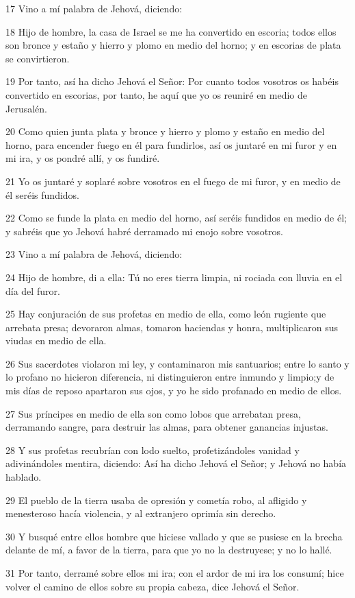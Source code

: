 \par 17 Vino a mí palabra de Jehová, diciendo:
\par 18 Hijo de hombre, la casa de Israel se me ha convertido en escoria; todos ellos son bronce y estaño y hierro y plomo en medio del horno; y en escorias de plata se convirtieron.
\par 19 Por tanto, así ha dicho Jehová el Señor: Por cuanto todos vosotros os habéis convertido en escorias, por tanto, he aquí que yo os reuniré en medio de Jerusalén.
\par 20 Como quien junta plata y bronce y hierro y plomo y estaño en medio del horno, para encender fuego en él para fundirlos, así os juntaré en mi furor y en mi ira, y os pondré allí, y os fundiré.
\par 21 Yo os juntaré y soplaré sobre vosotros en el fuego de mi furor, y en medio de él seréis fundidos.
\par 22 Como se funde la plata en medio del horno, así seréis fundidos en medio de él; y sabréis que yo Jehová habré derramado mi enojo sobre vosotros.
\par 23 Vino a mí palabra de Jehová, diciendo:
\par 24 Hijo de hombre, di a ella: Tú no eres tierra limpia, ni rociada con lluvia en el día del furor.
\par 25 Hay conjuración de sus profetas en medio de ella, como león rugiente que arrebata presa; devoraron almas, tomaron haciendas y honra, multiplicaron sus viudas en medio de ella.
\par 26 Sus sacerdotes violaron mi ley, y contaminaron mis santuarios; entre lo santo y lo profano no hicieron diferencia, ni distinguieron entre inmundo y limpio;y de mis días de reposo apartaron sus ojos, y yo he sido profanado en medio de ellos.
\par 27 Sus príncipes en medio de ella son como lobos que arrebatan presa, derramando sangre, para destruir las almas, para obtener ganancias injustas.
\par 28 Y sus profetas recubrían con lodo suelto, profetizándoles vanidad y adivinándoles mentira, diciendo: Así ha dicho Jehová el Señor; y Jehová no había hablado.
\par 29 El pueblo de la tierra usaba de opresión y cometía robo, al afligido y menesteroso hacía violencia, y al extranjero oprimía sin derecho.
\par 30 Y busqué entre ellos hombre que hiciese vallado y que se pusiese en la brecha delante de mí, a favor de la tierra, para que yo no la destruyese; y no lo hallé.
\par 31 Por tanto, derramé sobre ellos mi ira; con el ardor de mi ira los consumí; hice volver el camino de ellos sobre su propia cabeza, dice Jehová el Señor.

